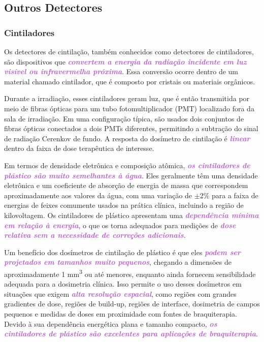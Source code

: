 \documentclass[11pt,a4paper]{article}
\begin{document}
\subsection*{Outros Detectores}

\subsubsection*{Cintiladores}

		Os detectores de cintilação, também conhecidos como detectores de cintiladores, são dispositivos que \textcolor{MediumOrchid}{\textit{\textbf{convertem a energia da radiação incidente em luz visível ou infravermelha próxima}}}. Essa conversão ocorre dentro de um material chamado cintilador, que é composto por cristais ou materiais orgânicos.

		Durante a irradiação, esses cintiladores geram luz, que é então transmitida por meio de fibras ópticas para um tubo fotomultiplicador (PMT) localizado fora da sala de irradiação. Em uma configuração típica, são usados dois conjuntos de fibras ópticas conectados a dois PMTs diferentes, permitindo a subtração do sinal de radiação Cerenkov de fundo. A resposta do dosímetro de cintilação é \textcolor{MediumOrchid}{\textit{\textbf{linear}}} dentro da faixa de dose terapêutica de interesse.

		Em termos de densidade eletrônica e composição atômica, \textcolor{MediumOrchid}{\textit{\textbf{os cintiladores de plástico são muito semelhantes à água}}}. Eles geralmente têm uma densidade eletrônica e um coeficiente de absorção de energia de massa que correspondem aproximadamente aos valores da água, com uma variação de $\pm$2\% para a faixa de energias de feixes comumente usados na prática clínica, incluindo a região de kilovoltagem. Os cintiladores de plástico apresentam uma \textcolor{MediumOrchid}{\textit{\textbf{dependência mínima em relação à energia}}}, o que os torna adequados para medições de \textcolor{MediumOrchid}{\textit{\textbf{dose relativa sem a necessidade de correções adicionais}}}.

		Um benefício dos dosímetros de cintilação de plástico é que eles \textcolor{MediumOrchid}{\textit{\textbf{podem ser projetados em tamanhos muito pequenos}}}, chegando a dimensões de aproximadamente 1 \unit{mm^3} ou até menores, enquanto ainda fornecem sensibilidade adequada para a dosimetria clínica. Isso permite o uso desses dosímetros em situações que exigem \textcolor{MediumOrchid}{\textit{\textbf{alta resolução espacial}}}, como regiões com grandes gradientes de dose, regiões de build-up, regiões de interface, dosimetria de campos pequenos e medidas de doses em proximidade com fontes de braquiterapia. Devido à sua dependência energética plana e tamanho compacto, \textcolor{MediumOrchid}{\textit{\textbf{os cintiladores de plástico são excelentes para aplicações de braquiterapia}}}.
\end{document}
